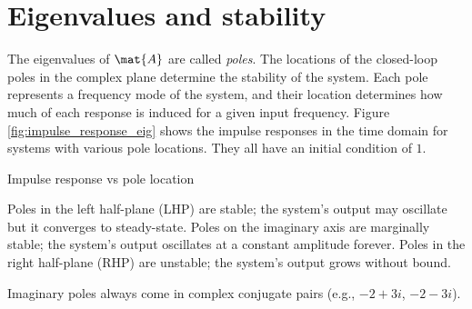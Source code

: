 \section{Eigenvalues and stability}

The eigenvalues of $\mat{A}$ are called \textit{poles}. The locations of the
closed-loop poles in the complex plane determine the stability of the
\gls{system}. Each pole represents a frequency mode of the \gls{system}, and
their location determines how much of each response is induced for a given input
frequency. Figure \ref{fig:impulse_response_eig} shows the \glspl{impulse
response} in the time domain for \glspl{system} with various pole locations.
They all have an initial condition of $1$.
\begin{bookfigure}
  
  \caption{Impulse response vs pole location}
  \label{fig:impulse_response_eig}
\end{bookfigure}

Poles in the left half-plane (LHP) are stable; the \gls{system}'s output may
oscillate but it converges to steady-state. Poles on the imaginary axis are
marginally stable; the \gls{system}'s output oscillates at a constant amplitude
forever. Poles in the right half-plane (RHP) are unstable; the \gls{system}'s
output grows without bound.
\begin{remark}
  Imaginary poles always come in complex conjugate pairs (e.g., $-2 + 3i$,
  $-2 - 3i$).
\end{remark}
